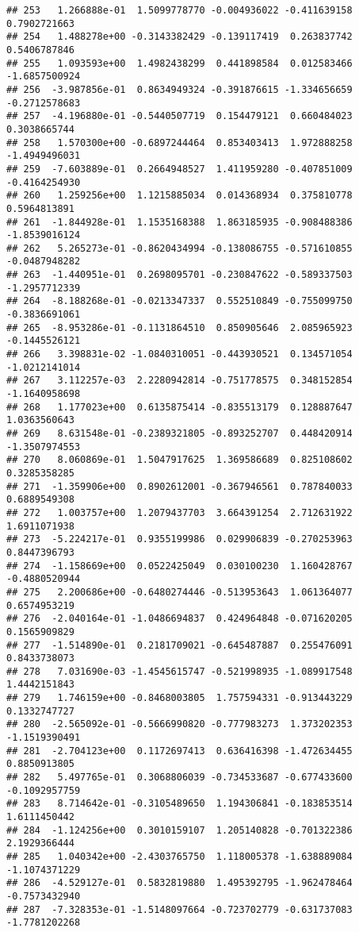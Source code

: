 \documentclass[
]{article}
\begin{document}
\begin{verbatim}
## 253   1.266888e-01  1.5099778770 -0.004936022 -0.411639158  0.7902721663
## 254   1.488278e+00 -0.3143382429 -0.139117419  0.263837742  0.5406787846
## 255   1.093593e+00  1.4982438299  0.441898584  0.012583466 -1.6857500924
## 256  -3.987856e-01  0.8634949324 -0.391876615 -1.334656659 -0.2712578683
## 257  -4.196880e-01 -0.5440507719  0.154479121  0.660484023  0.3038665744
## 258   1.570300e+00 -0.6897244464  0.853403413  1.972888258 -1.4949496031
## 259  -7.603889e-01  0.2664948527  1.411959280 -0.407851009 -0.4164254930
## 260   1.259256e+00  1.1215885034  0.014368934  0.375810778  0.5964813891
## 261  -1.844928e-01  1.1535168388  1.863185935 -0.908488386 -1.8539016124
## 262   5.265273e-01 -0.8620434994 -0.138086755 -0.571610855 -0.0487948282
## 263  -1.440951e-01  0.2698095701 -0.230847622 -0.589337503 -1.2957712339
## 264  -8.188268e-01 -0.0213347337  0.552510849 -0.755099750 -0.3836691061
## 265  -8.953286e-01 -0.1131864510  0.850905646  2.085965923 -0.1445526121
## 266   3.398831e-02 -1.0840310051 -0.443930521  0.134571054 -1.0212141014
## 267   3.112257e-03  2.2280942814 -0.751778575  0.348152854 -1.1640958698
## 268   1.177023e+00  0.6135875414 -0.835513179  0.128887647  1.0363560643
## 269   8.631548e-01 -0.2389321805 -0.893252707  0.448420914 -1.3507974553
## 270   8.060869e-01  1.5047917625  1.369586689  0.825108602  0.3285358285
## 271  -1.359906e+00  0.8902612001 -0.367946561  0.787840033  0.6889549308
## 272   1.003757e+00  1.2079437703  3.664391254  2.712631922  1.6911071938
## 273  -5.224217e-01  0.9355199986  0.029906839 -0.270253963  0.8447396793
## 274  -1.158669e+00  0.0522425049  0.030100230  1.160428767 -0.4880520944
## 275   2.200686e+00 -0.6480274446 -0.513953643  1.061364077  0.6574953219
## 276  -2.040164e-01 -1.0486694837  0.424964848 -0.071620205  0.1565909829
## 277  -1.514890e-01  0.2181709021 -0.645487887  0.255476091  0.8433738073
## 278   7.031690e-03 -1.4545615747 -0.521998935 -1.089917548  1.4442151843
## 279   1.746159e+00 -0.8468003805  1.757594331 -0.913443229  0.1332747727
## 280  -2.565092e-01 -0.5666990820 -0.777983273  1.373202353 -1.1519390491
## 281  -2.704123e+00  0.1172697413  0.636416398 -1.472634455  0.8850913805
## 282   5.497765e-01  0.3068806039 -0.734533687 -0.677433600 -0.1092957759
## 283   8.714642e-01 -0.3105489650  1.194306841 -0.183853514  1.6111450442
## 284  -1.124256e+00  0.3010159107  1.205140828 -0.701322386  2.1929366444
## 285   1.040342e+00 -2.4303765750  1.118005378 -1.638889084 -1.1074371229
## 286  -4.529127e-01  0.5832819880  1.495392795 -1.962478464 -0.7573432940
## 287  -7.328353e-01 -1.5148097664 -0.723702779 -0.631737083 -1.7781202268

\end{verbatim}
\end{document}
